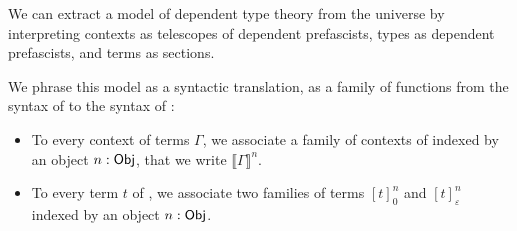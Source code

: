 We can extract a model of dependent type theory from the universe 
by interpreting contexts as telescopes of dependent prefascists, types as dependent
prefascists, and terms as sections.

We phrase this model as a syntactic translation, \ie as a family of functions
from the syntax of \MLTT to the syntax of \SetoidCCplus:
% 
\begin{itemize}
\item To every context of \MLTT terms \( \Gamma \), we associate a family of contexts of \SetoidCCplus
    indexed by an object \( n : \func{Obj} \), that we write \( \llbracket Γ \rrbracket^n \).
\item To every term \( t \) of \MLTT, we associate two families of terms
    \( {[t]}^n_0 \) and \( {[t]}^n_ε \) indexed by an object \( n : \func{Obj} \).
\end{itemize}

